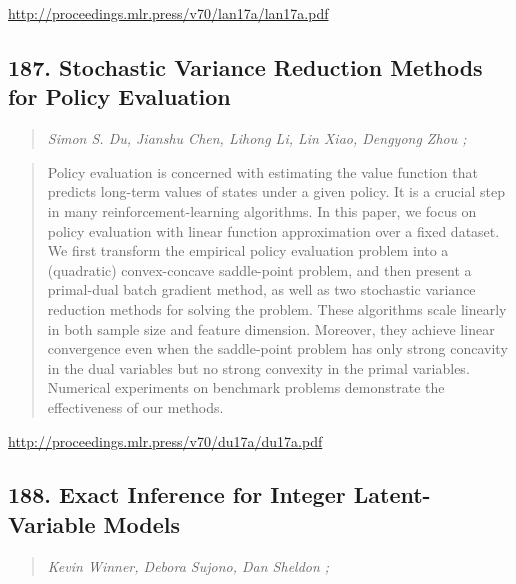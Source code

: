 \documentclass{article}
\begin{document}
\href{http://proceedings.mlr.press/v70/lan17a/lan17a.pdf}{http://proceedings.mlr.press/v70/lan17a/lan17a.pdf}

\subsection{187. Stochastic Variance Reduction Methods for Policy Evaluation}

\begin{quote}
\footnotesize{\textit{Simon S. Du, Jianshu Chen, Lihong Li, Lin Xiao, Dengyong Zhou ;}}

\end{quote}

\begin{quote}
    Policy evaluation is concerned with estimating the value function that predicts long-term values of states under a given policy. It is a crucial step in many reinforcement-learning algorithms. In this paper, we focus on policy evaluation with linear function approximation over a fixed dataset. We first transform the empirical policy evaluation problem into a (quadratic) convex-concave saddle-point problem, and then present a primal-dual batch gradient method, as well as two stochastic variance reduction methods for solving the problem. These algorithms scale linearly in both sample size and feature dimension. Moreover, they achieve linear convergence even when the saddle-point problem has only strong concavity in the dual variables but no strong convexity in the primal variables. Numerical experiments on benchmark problems demonstrate the effectiveness of our methods.  
\end{quote}

\href{http://proceedings.mlr.press/v70/du17a/du17a.pdf}{http://proceedings.mlr.press/v70/du17a/du17a.pdf}

\subsection{188. Exact Inference for Integer Latent-Variable Models}

\begin{quote}
\footnotesize{\textit{Kevin Winner, Debora Sujono, Dan Sheldon ;}}

\end{quote}
\end{document}
